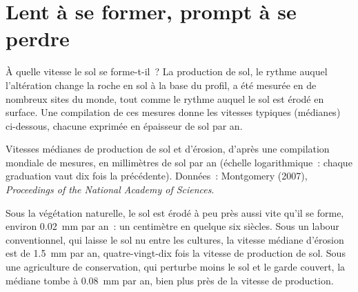 \section{Lent à se former, prompt à se perdre}

À quelle vitesse le sol se forme-t-il~? La production de sol, le rythme
auquel l'altération change la roche en sol à la base du profil, a été
mesurée en de nombreux sites du monde, tout comme le rythme auquel le sol
est érodé en surface. Une compilation de ces mesures donne les vitesses
typiques (médianes) ci-dessous, chacune exprimée en épaisseur de sol par
an.

\begin{omfigure}

{\small Vitesses médianes de production de sol et d'érosion, d'après une
compilation mondiale de mesures, en millimètres de sol par an (échelle
logarithmique~: chaque graduation vaut dix fois la précédente).
Données~: Montgomery (2007), \emph{Proceedings of the National Academy of
Sciences}.}
\end{omfigure}

Sous la végétation naturelle, le sol est érodé à peu près aussi vite qu'il
se forme, environ \qty{0.02}{mm} par an~: un centimètre en quelque six
siècles. Sous un labour conventionnel, qui laisse le sol nu entre les
cultures, la vitesse médiane d'érosion est de \qty{1.5}{mm} par an,
quatre-vingt-dix fois la vitesse de production de sol. Sous une agriculture
de conservation, qui perturbe moins le sol et le garde couvert, la médiane
tombe à \qty{0.08}{mm} par an, bien plus près de la vitesse de production.

